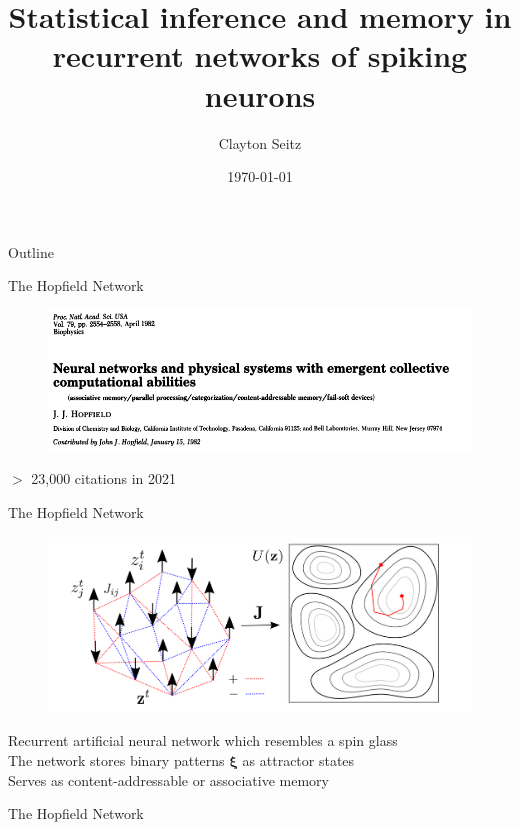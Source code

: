 \documentclass[aspectratio=169]{beamer}
\begin{document}
\title{Statistical inference and memory in recurrent networks of spiking neurons}  
\author{Clayton Seitz}
\date{\today} 

\maketitle


\begin{frame}{Outline}
\tableofcontents
\end{frame}

\begin{frame}{The Hopfield Network}
\begin{figure}
\includegraphics[width=140mm]{hopfield}
\end{figure}
$>$ 23,000 citations in 2021
\end{frame}

\begin{frame}{The Hopfield Network}
\begin{figure}
\includegraphics[width=140mm]{hopfield-sketch}
\end{figure}
Recurrent artificial neural network which resembles a spin glass\\
The network stores binary patterns $\mathbf{\xi}$ as attractor states\\
Serves as content-addressable or associative memory
\end{frame}

\begin{frame}{The Hopfield Network}

\end{frame}
\end{document}

